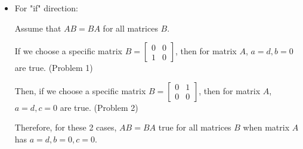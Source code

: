 \documentclass[10pt]{article}
\begin{document}
\begin{itemize}
    \item For "if" direction: \par
    Assume that $AB=BA$ for all matrices $B$. \par
    If we choose a specific matrix $B=
    \begin{bmatrix}
        0 & 0 \\
        1 & 0
    \end{bmatrix}$, then for matrix $A$, $a=d, b=0$ are true. (Problem 1) \par
    Then, if we choose a specific matrix $B=
    \begin{bmatrix}
        0 & 1 \\
        0 & 0
    \end{bmatrix}$, then for matrix $A$, $a=d, c=0$ are true. (Problem 2) \par
    Therefore, for these 2 cases, $AB=BA$ true for all matrices $B$ when matrix $A$ has $a=d, b=0, c=0$.
\end{itemize}

\noindent 
\noindent 
\end{document}
